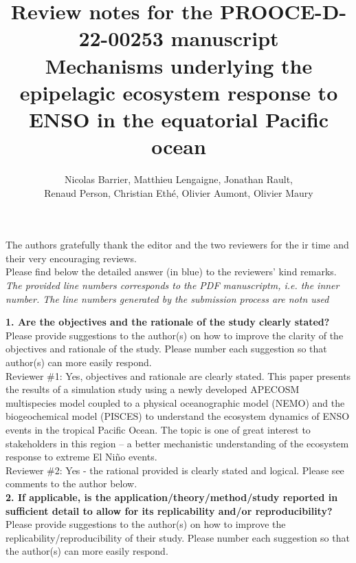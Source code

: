 \documentclass[12pt]{article}
\author{Nicolas Barrier, Matthieu Lengaigne, Jonathan Rault,\\Renaud Person, Christian Eth\'{e}, Olivier Aumont, Olivier Maury}
\title{Review notes for the PROOCE-D-22-00253 manuscript \\
\large 
Mechanisms underlying the epipelagic ecosystem
response to ENSO in the equatorial Pacific ocean}
\begin{document}
\onehalfspacing

\maketitle

The authors gratefully thank the editor and the two reviewers for the	ir time and their very encouraging reviews. \\

Please find below the detailed answer (in blue) to the reviewers' kind remarks. \\

\emph{The provided line numbers corresponds to the PDF manuscriptm, i.e. the inner number. The line numbers generated by the submission process are notn used}\\

\clearpage

\textbf{1. Are the objectives and the rationale of the study clearly stated?} \\

Please provide suggestions to the author(s) on how to improve the clarity of the objectives and rationale of the study. Please number each suggestion so that author(s) can more easily respond.\\	

Reviewer \#1: Yes, objectives and rationale are clearly stated. This paper presents the results of a simulation study using a newly developed APECOSM multispecies model coupled to a physical oceanographic model (NEMO) and the biogeochemical model (PISCES) to understand the ecosystem dynamics of ENSO events in the tropical Pacific Ocean. The topic is one of great interest to stakeholders in this region – a better mechanistic understanding of the ecosystem response to extreme El Niño events. \\

Reviewer \#2: Yes - the rational provided is clearly stated and logical. Please see comments to the author below.\\

\textbf{2. If applicable, is the application/theory/method/study reported in sufficient detail to allow for its replicability and/or reproducibility?} \\ 

Please provide suggestions to the author(s) on how to improve the replicability/reproducibility of their study. Please number each suggestion so that the author(s) can more easily respond. \\
\end{document}
